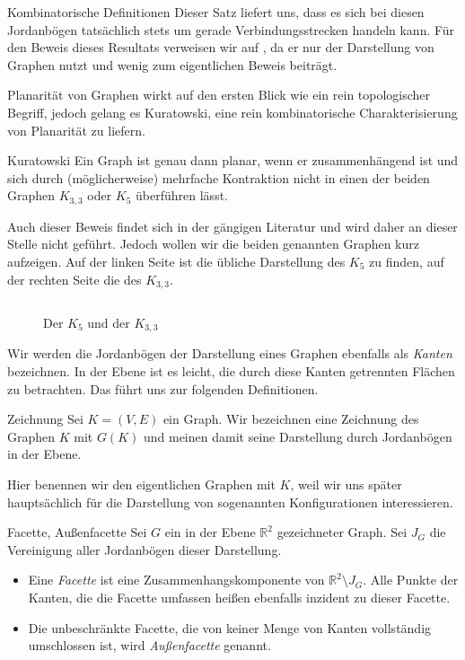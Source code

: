 \begin{section}{Kombinatorische Definitionen}
  Dieser Satz liefert uns, dass es sich bei diesen Jordanbögen tatsächlich stets um gerade Verbindungsstrecken handeln kann. Für den Beweis dieses Resultats verweisen wir auf \cite[Seite 113]{fritsch}, da er nur der Darstellung von Graphen nutzt und wenig zum eigentlichen Beweis beiträgt. 
  
  Planarität von Graphen wirkt auf den ersten Blick wie ein rein topologischer Begriff, jedoch gelang es Kuratowski, eine rein kombinatorische Charakterisierung von Planarität zu liefern.
  
  \begin{satz}{Kuratowski}
   Ein Graph ist genau dann planar, wenn er zusammenhängend ist und sich durch (möglicherweise) mehrfache Kontraktion nicht in einen der beiden Graphen $K_{3,3}$ oder $K_5$ überführen lässt.
  \end{satz}
  
  Auch dieser Beweis findet sich in der gängigen Literatur und wird daher an dieser Stelle nicht geführt. Jedoch wollen wir die beiden genannten Graphen kurz aufzeigen. Auf der linken Seite ist die übliche Darstellung des $K_5$ zu finden, auf der rechten Seite die des $K_{3,3}$.
  
  \begin{figure}[hb]
   \label{kuratowski}
   \[  \]
   \caption[Der $K_5$ und der $K_{3,3}$]{Der $K_5$ und der $K_{3,3}$}
  \end{figure}


  Wir werden die Jordanbögen der Darstellung eines Graphen ebenfalls als \textit{Kanten} bezeichnen. In der Ebene ist es leicht, die durch diese Kanten getrennten Flächen zu betrachten. Das führt uns zur folgenden Definitionen.
  
  \begin{definition}{Zeichnung}
    Sei $K=(V,E)$ ein Graph. Wir bezeichnen eine Zeichnung des Graphen $K$ mit $G(K)$ und meinen damit seine Darstellung durch Jordanbögen in der Ebene.
  \end{definition}
  
  Hier benennen wir den eigentlichen Graphen mit $K$, weil wir uns später hauptsächlich für die Darstellung von sogenannten Konfigurationen interessieren.

  \begin{definition}{Facette, Außenfacette}
   Sei $G$ ein in der Ebene $\mathbb{R}^2$ gezeichneter Graph. Sei $J_G$ die Vereinigung aller Jordanbögen dieser Darstellung.
   \begin{itemize}
   \item Eine \textit{Facette} ist eine Zusammenhangskomponente von $\mathbb{R}^2 \setminus J_G$. Alle Punkte der Kanten, die die Facette umfassen heißen ebenfalls inzident zu dieser Facette. 
   \item Die unbeschränkte Facette, die von keiner Menge von Kanten vollständig umschlossen ist, wird \textit{Außenfacette} genannt.
   \end{itemize}
  \end{definition}
  

\end{section}
